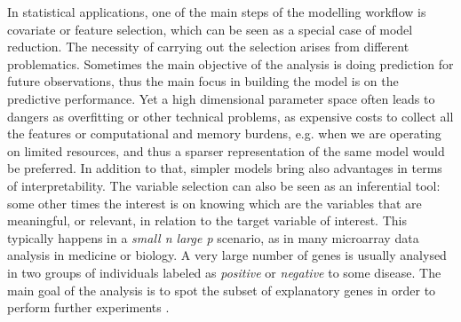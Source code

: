 \documentclass[american,]{article}
\theoremstyle{definition}
\begin{document}
In statistical applications, one of the main steps of the modelling workflow is covariate or feature selection, which can be seen as a special case of model reduction. The necessity of carrying out the selection arises from different problematics. Sometimes the main objective of the analysis is doing prediction for future observations, thus the main focus in building the model is on the predictive performance. Yet a high dimensional parameter space often leads to dangers as overfitting or other technical problems, as expensive costs to collect all the features or computational and memory burdens, e.g. when we are operating on limited resources, and thus a sparser representation of the same model would be preferred. In addition to that, simpler models bring also advantages in terms of interpretability. The variable selection can also be seen as an inferential tool: some other times the interest is on knowing which are the variables that are meaningful, or relevant, in relation to the target variable of interest. This typically happens in a \textit{small n large p} scenario, as in many microarray data analysis in medicine or biology. A very large number of genes is usually analysed in two groups of individuals labeled as \textit{positive} or \textit{negative} to some disease. The main goal of the analysis is to spot the subset of explanatory genes in order to perform further experiments \cite[see examples in][]{book:efron}.
\end{document}
